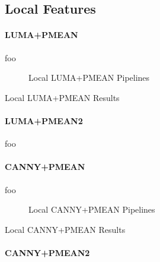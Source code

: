 \subsection{Local Features}

\paragraph{LUMA+PMEAN}

foo

\begin{figure}[h]
    \centering
    
    \caption[Local LUMA+PMEAN Pipelines]{
        Local LUMA+PMEAN Pipelines
    }
    \label{fig:pipeline_local_luma_pmean}
\end{figure}

\begin{table}[h]
    \centering
    
    \caption[Local LUMA+PMEAN Results]{
        Local LUMA+PMEAN Results
    }
    \label{tab:results_local_luma_pmean}
\end{table}

\paragraph{LUMA+PMEAN2}

foo

\paragraph{CANNY+PMEAN}

foo

\begin{figure}[h]
    \centering
    
    \caption[Local CANNY+PMEAN Pipelines]{
        Local CANNY+PMEAN Pipelines
    }
    \label{fig:pipeline_local_luma_canny_pmean}
\end{figure}

\begin{table}[h]
    \centering
    
    \caption[Local CANNY+PMEAN Results]{
        Local CANNY+PMEAN Results
    }
    \label{tab:results_local_luma_canny_pmean}
\end{table}

\paragraph{CANNY+PMEAN2}

